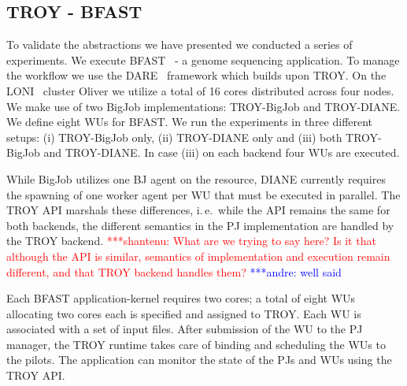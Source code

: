\documentclass[conference,final]{IEEEtran}
\newcommand{\jhanote}[1]{ {\textcolor{red} { ***shantenu: #1 }}}
\newcommand{\alnote}[1]{ {\textcolor{blue} { ***andre: #1 }}}
\newcommand{\smnote}[1]{ {\textcolor{green} { ***sharath: #1 }}}
\newcommand{\alnote}[1]{}
\newcommand{\smnote}[1]{}
\newcommand{\jhanote}[1]{}
\begin{document}
\subsection{TROY - BFAST}
To validate the abstractions we have presented we conducted a series of
experiments. We execute BFAST~\cite{bfast2009} - a genome sequencing
application. To manage the workflow we use the DARE~\cite{dare-tg11} framework
which builds upon TROY. On the LONI~\cite{loni} cluster Oliver we utilize a
total of 16 cores distributed across four nodes. We make use of two BigJob
implementations: TROY-BigJob and TROY-DIANE. We define eight WUs for BFAST. We
run the experiments in three different setups: (i) TROY-BigJob only, (ii)
TROY-DIANE only and (iii) both TROY-BigJob and TROY-DIANE. In case (iii) on
each backend four WUs are executed.

While BigJob utilizes one BJ agent on the resource, DIANE
currently requires the spawning of one worker agent per WU that must be executed in
parallel.
The TROY API marshals
these differences, i.\,e.\ while the API remains the same for both backends,
the different semantics in the PJ implementation are handled by the TROY 
backend.
\jhanote{What are we trying to say here?  Is it that although the API
  is similar, semantics of implementation and execution remain
  different, and that TROY backend handles them?}\alnote{well said}

Each BFAST application-kernel requires two cores; a total of eight WUs
allocating two cores each is specified and assigned to TROY. Each WU
is associated with a set of input files. After submission of the WU to
the PJ manager, the TROY runtime takes care of binding and scheduling
the WUs to the pilots. The application can monitor the state of the
PJs and WUs using the TROY API.



\end{document}

